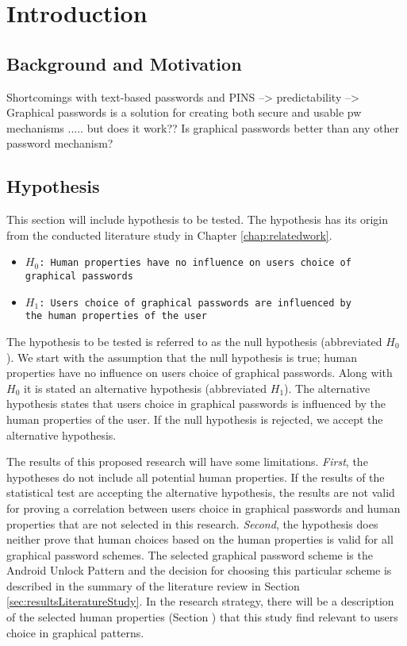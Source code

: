 \chapter{Introduction}\label{chap:introduction}
	
	\section{Background and Motivation} \label{sec:backgroundandmotivation}

		Shortcomings with text-based passwords and PINS 
		--> predictability
		--> Graphical passwords is a solution for creating both secure and usable pw mechanisms
		..... but does it work?? Is graphical passwords better than any other password mechanism?

	\section{Hypothesis}\label{sec:hypothesis}

		This section will include hypothesis to be tested. The hypothesis has its origin from the conducted literature study in Chapter \ref{chap:relatedwork}.

		{\renewcommand\labelitemi{}
			\begin{itemize}
	  		\item \texttt{$H_{0}$: Human properties have no influence on users choice of \\graphical passwords}
	  		\item \texttt{$H_{1}$: Users choice of graphical passwords are influenced by \\the human properties of the user}
	  	\end{itemize}
	  }

	  The hypothesis to be tested is referred to as the null hypothesis (abbreviated $H_{0}$). We start with the assumption that the null hypothesis is true; human properties have no influence on users choice of graphical passwords. Along with $H_{0}$ it is stated an alternative hypothesis (abbreviated $H_{1}$). The alternative hypothesis states that users choice in graphical passwords is influenced by the human properties of the user. If the null hypothesis is rejected, we accept the alternative hypothesis.

	  The results of this proposed research will have some limitations. {\it First}, the hypotheses do not include all potential human properties. If the results of the statistical test are accepting the alternative hypothesis, the results are not valid for proving a correlation between users choice in graphical passwords and human properties that are not selected in this research. {\it Second}, the hypothesis does neither prove that human choices based on the human properties is valid for all graphical password schemes. The selected graphical password scheme is the Android Unlock Pattern and the decision for choosing this particular scheme is described in the summary of the literature review in Section \ref{sec:resultsLiteratureStudy}. In the research strategy, there will be a description of the selected human properties (Section ) that this study find relevant to users choice in graphical patterns.


